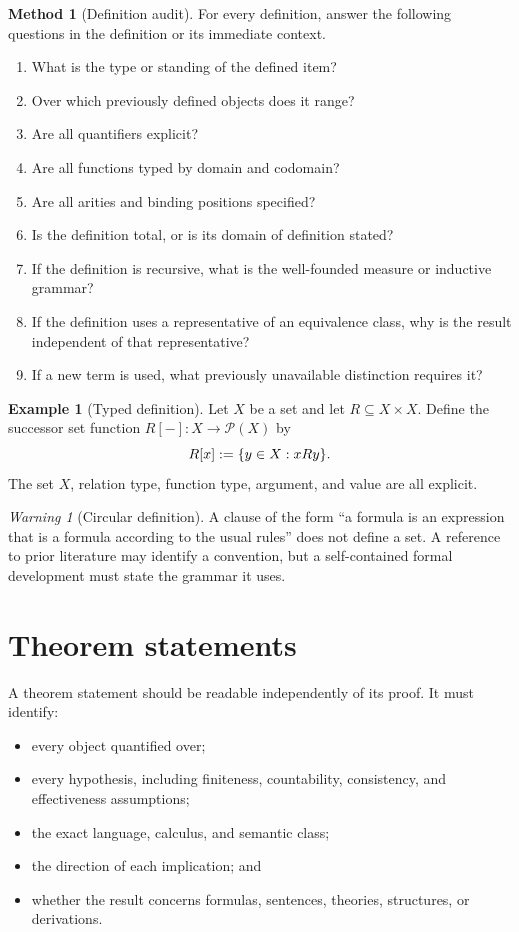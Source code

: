 \documentclass[11pt,oneside,openany]{book}
\theoremstyle{definition}
\newtheorem{example}[definition]{Example}
\newtheorem{method}[definition]{Method}
\theoremstyle{plain}
\theoremstyle{remark}
\newtheorem{warning}[definition]{Warning}
\DeclarePairedDelimiter{\set}{\lbrace}{\rbrace}
\newcommand{\Pow}{\mathcal{P}}
\newcommand{\defeq}{\mathrel{:=}}
\begin{document}
\begin{method}[Definition audit]
For every definition, answer the following questions in the definition or its
immediate context.
\begin{enumerate}
  \item What is the type or standing of the defined item?
  \item Over which previously defined objects does it range?
  \item Are all quantifiers explicit?
  \item Are all functions typed by domain and codomain?
  \item Are all arities and binding positions specified?
  \item Is the definition total, or is its domain of definition stated?
  \item If the definition is recursive, what is the well-founded measure or
        inductive grammar?
  \item If the definition uses a representative of an equivalence class, why is
        the result independent of that representative?
  \item If a new term is used, what previously unavailable distinction requires
        it?
\end{enumerate}
\end{method}

\begin{example}[Typed definition]
Let \(X\) be a set and let \(R\subseteq X\times X\).  Define the successor set
function \(R[-]:X\to\Pow(X)\) by
\[
  R[x]\defeq\set{y\in X:xRy}.
\]
The set \(X\), relation type, function type, argument, and value are all
explicit.
\end{example}

\begin{warning}[Circular definition]
A clause of the form ``a formula is an expression that is a formula according
to the usual rules'' does not define a set.  A reference to prior literature
may identify a convention, but a self-contained formal development must state
the grammar it uses.
\end{warning}

\section{Theorem statements}
\label{sec:writing-foundations-03}

A theorem statement should be readable independently of its proof.  It must
identify:
\begin{itemize}
  \item every object quantified over;
  \item every hypothesis, including finiteness, countability, consistency, and
        effectiveness assumptions;
  \item the exact language, calculus, and semantic class;
  \item the direction of each implication; and
  \item whether the result concerns formulas, sentences, theories, structures,
        or derivations.
\end{itemize}
\end{document}
